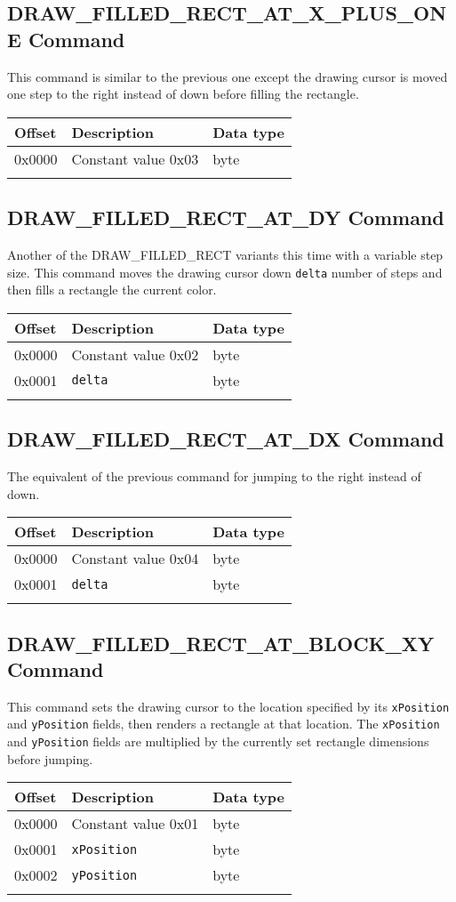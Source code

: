 \documentclass{article}
\newcommand{\field}[1]{\textcolor{fieldColor}{\texttt{#1}}}
\newenvironment{bytelisting}
{\ttfamily \begin{center} \begin{tabular}{l l l} Offset & Description & Data type \\ \hline}
{\normalfont \end{tabular} \end{center}}
\begin{document}
\subsection{DRAW\_FILLED\_RECT\_AT\_X\_PLUS\_ONE Command}
This command is similar to the previous one except the drawing cursor is moved one step to the right instead of down before filling the rectangle.

\begin{bytelisting}
0x0000 & Constant value 0x03 & byte \\
\end{bytelisting}

\subsection{DRAW\_FILLED\_RECT\_AT\_DY Command}
Another of the DRAW\_FILLED\_RECT variants this time with a variable step size. This command moves the drawing cursor down \field{delta} number of steps and then fills a rectangle the current color.

\begin{bytelisting}
0x0000 & Constant value 0x02 & byte \\
0x0001 & \field{delta} & byte \\
\end{bytelisting}

\subsection{DRAW\_FILLED\_RECT\_AT\_DX Command}
The equivalent of the previous command for jumping to the right instead of down.

\begin{bytelisting}
0x0000 & Constant value 0x04 & byte \\
0x0001 & \field{delta} & byte \\
\end{bytelisting}

\subsection{DRAW\_FILLED\_RECT\_AT\_BLOCK\_XY Command}
This command sets the drawing cursor to the location specified by its \field{xPosition} and \field{yPosition} fields, then renders a rectangle at that location.
The \field{xPosition} and \field{yPosition} fields are multiplied by the currently set rectangle dimensions before jumping.

\begin{bytelisting}
0x0000 & Constant value 0x01 & byte \\
0x0001 & \field{xPosition} & byte \\
0x0002 & \field{yPosition} & byte \\
\end{bytelisting}
\end{document}
